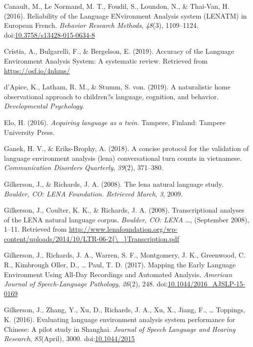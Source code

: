 \documentclass[english,floatsintext,man]{apa6}
\begin{document}
\hypertarget{ref-Canault2016}{}
Canault, M., Le Normand, M. T., Foudil, S., Loundon, N., \& Thai-Van, H.
(2016). Reliability of the Language ENvironment Analysis system (LENATM)
in European French. \emph{Behavior Research Methods}, \emph{48}(3),
1109--1124.
doi:\href{https://doi.org/10.3758/s13428-015-0634-8}{10.3758/s13428-015-0634-8}

\hypertarget{ref-Cristia}{}
Cristia, A., Bulgarelli, F., \& Bergelson, E. (2019). Accuracy of the
Language Environment Analysis System: A systematic review. Retrieved
from \url{https://osf.io/4nhms/}

\hypertarget{ref-d2019naturalistic}{}
d'Apice, K., Latham, R. M., \& Stumm, S. von. (2019). A naturalistic
home observational approach to children?s language, cognition, and
behavior. \emph{Developmental Psychology}.

\hypertarget{ref-Elo}{}
Elo, H. (2016). \emph{Acquiring language as a twin}. Tampere, Finland:
Tampere University Press.

\hypertarget{ref-ganek2018concise}{}
Ganek, H. V., \& Eriks-Brophy, A. (2018). A concise protocol for the
validation of language environment analysis (lena) conversational turn
counts in vietnamese. \emph{Communication Disorders Quarterly},
\emph{39}(2), 371--380.

\hypertarget{ref-gilkerson2008lena}{}
Gilkerson, J., \& Richards, J. A. (2008). The lena natural language
study. \emph{Boulder, CO: LENA Foundation. Retrieved March}, \emph{3},
2009.

\hypertarget{ref-Gilkerson2008ltr6}{}
Gilkerson, J., Coulter, K. K., \& Richards, J. A. (2008).
Transcriptional analyses of the LENA natural language corpus.
\emph{Boulder, CO: LENA \ldots{}}, (September 2008), 1--11. Retrieved
from
\href{http://www.lenafoundation.org/wp-content/uploads/2014/10/LTR-06-2\%7B/_\%7DTranscription.pdf}{http://www.lenafoundation.org/wp-content/uploads/2014/10/LTR-06-2\{\textbackslash{}\_\}Transcription.pdf}

\hypertarget{ref-Gilkerson2017}{}
Gilkerson, J., Richards, J. A., Warren, S. F., Montgomery, J. K.,
Greenwood, C. R., Kimbrough Oller, D., \ldots{} Paul, T. D. (2017).
Mapping the Early Language Environment Using All-Day Recordings and
Automated Analysis. \emph{American Journal of Speech-Language
Pathology}, \emph{26}(2), 248.
doi:\href{https://doi.org/10.1044/2016_AJSLP-15-0169}{10.1044/2016\_AJSLP-15-0169}

\hypertarget{ref-Gilkerson2016}{}
Gilkerson, J., Zhang, Y., Xu, D., Richards, J. A., Xu, X., Jiang, F.,
\ldots{} Toppings, K. (2016). Evaluating language environment analysis
system performance for Chinese: A pilot study in Shanghai. \emph{Journal
of Speech Language and Hearing Research}, \emph{85}(April), 3000.
doi:\href{https://doi.org/10.1044/2015}{10.1044/2015}
\end{document}
